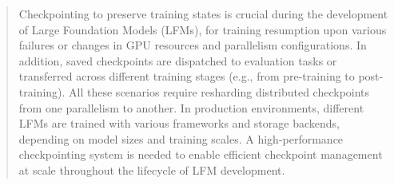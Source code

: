 \documentclass[letterpaper,twocolumn,10pt]{article}
\newcommand{\cwu}[1]{{\textcolor{orange}{CWu: #1}}}
\begin{document}
\begin{abstract}
Checkpointing to preserve training states is crucial during the development of Large Foundation Models (LFMs), for training resumption upon various failures or changes in GPU resources and parallelism configurations.
In addition, saved checkpoints are dispatched to evaluation tasks or transferred across different training stages (e.g., from pre-training to post-training). 
All these scenarios require resharding distributed checkpoints from one parallelism to another.
In production environments, different LFMs are trained with various frameworks and storage backends, depending on model sizes and training scales.
A high-performance checkpointing system %
is needed to enable efficient checkpoint management at scale throughout the lifecycle of LFM development. %


\end{abstract}
\end{document}
